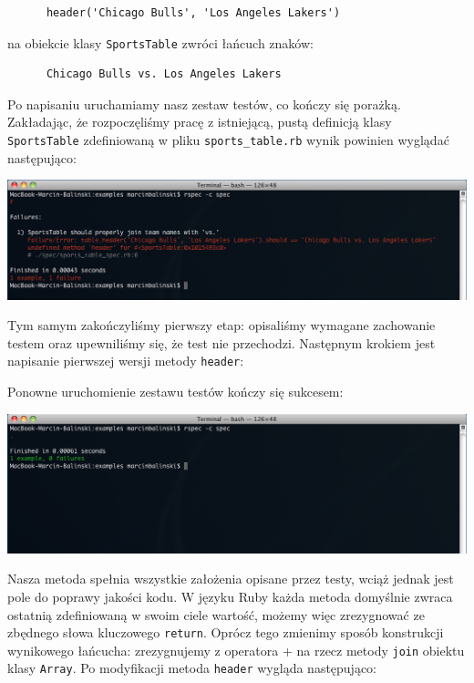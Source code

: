    \begin{lstlisting} 
      header('Chicago Bulls', 'Los Angeles Lakers')
    \end{lstlisting}
    
    na obiekcie klasy \verb+SportsTable+ zwróci łańcuch znaków:
    
    \begin{lstlisting} 
      Chicago Bulls vs. Los Angeles Lakers
    \end{lstlisting}
    
    Po napisaniu uruchamiamy nasz zestaw testów, co kończy się porażką. Zakładając, że rozpoczęliśmy pracę z istniejącą, pustą definicją klasy \verb+SportsTable+ zdefiniowaną w pliku \verb+sports_table.rb+ wynik powinien wyglądać następująco:

    \includegraphics[width=160mm]{images/example1_failure.png}
    
    Tym samym zakończyliśmy pierwszy etap: opisaliśmy wymagane zachowanie testem oraz upewniliśmy się, że test nie przechodzi. Następnym krokiem jest napisanie pierwszej wersji metody \verb+header+:
    
    
    
    Ponowne uruchomienie zestawu testów kończy się sukcesem:
    
    \includegraphics[width=160mm]{images/example1_success.png}
    
    Nasza metoda spełnia wszystkie założenia opisane przez testy, wciąż jednak jest pole do poprawy jakości kodu. W języku Ruby każda metoda domyślnie zwraca ostatnią zdefiniowaną w swoim ciele wartość, możemy więc zrezygnować ze zbędnego słowa kluczowego \verb+return+. Oprócz tego zmienimy sposób konstrukcji wynikowego łańcucha: zrezygnujemy z operatora \verb+++ na rzecz metody \verb+join+ obiektu klasy \verb+Array+. Po modyfikacji metoda \verb+header+ wygląda następująco:
    
